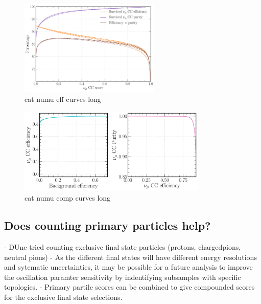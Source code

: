 \begin{figure} %
    \includegraphics[width=0.6\textwidth]{diagrams/7-cvn/chipsnet/cat_numu_eff_curves.pdf}
    \caption[cat numu eff curves short]
    {cat numu eff curves long}
    \label{fig:cat_numu_eff_curves}
\end{figure}

\begin{figure} %
    \includegraphics[width=0.8\textwidth]{diagrams/7-cvn/chipsnet/cat_numu_comp_curves.pdf}
    \caption[cat numu comp curves short]
    {cat numu comp curves long}
    \label{fig:cat_numu_comp_curves}
\end{figure}

\subsection{Does counting primary particles help?} %
\label{sec:cvn_beam_prim} %

- DUne tried counting exclusive final state particles (protons, chargedpions, neutral pions)
- As the different final states will have different energy resolutions and sytematic
uncertainties, it may be possible for a future analysis to improve the oscillation paramter
sensitivity by indentifying subsamples with specific topologies.
- Primary partile scores can be combined to give compounded scores for the exclusive final state
selections.

